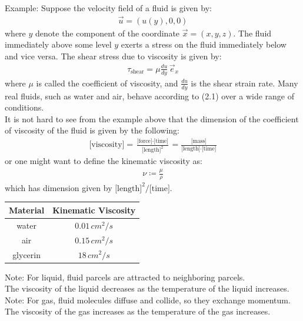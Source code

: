 \documentclass[11pt]{book}
\theoremstyle{break}
\theoremstyle{break}
\newcommand{\note}{\color{red}Note: \color{black}}
\newcommand{\example}{\color{green}Example: \color{black}}
\begin{document}
\example
Suppose the velocity field of a fluid is given by:
\begin{align*}
\vec{u} = (u(y),0,0)
\end{align*}
where $y$ denote the component of the coordinate $\vec{x} = (x,y,z)$. The fluid immediately above some level $y$ exerts a stress on the fluid immediately below and vice versa. The shear stress due to viscosity is given by:
\begin{align}
\tau_{\text{shear}} = \mu \frac{du}{dy}\, \vec{e}_x
\end{align}
where $\mu$ is called the coefficient of viscosity, and $\frac{du}{dy}$ is the shear strain rate. Many real fluids, such as water and air, behave according to (2.1) over a wide range of conditions.\\ 

It is not hard to see from the example above that the dimension of the coefficient of viscosity of the fluid is given by the following:
\begin{align*}
\text{[viscosity]} = \frac{\text{[force]}\cdot \text{[time]}}{\text{[length]}^2} = \frac{\text{[mass]}}{\text{[length]}\cdot \text{[time]}} 
\end{align*}
or one might want to define the kinematic viscosity as:
\begin{align*}
\nu \coloneqq \frac{\mu}{\rho}
\end{align*}
which has dimension given by $\text{[length]}^2 / \text{[time]}$.\\

\begin{center}
\begin{tabular}{|c|c|}
\hline
Material & Kinematic Viscosity\\ 
\hline
water & $0.01\, cm^2/s$\\
\hline
air & $0.15 \, cm^2/s$\\
\hline
glycerin & $18\, cm^2/s$\\
\hline
\end{tabular}
\end{center}

\note For liquid, fluid parcels are attracted to neighboring parcels. \\The viscosity of the liquid decreases as the temperature of the liquid increases.\\


\note For gas, fluid molecules diffuse and collide, so they exchange momentum. \\
The viscosity of the gas increases as the temperature of the gas increases.\\
\end{document}
